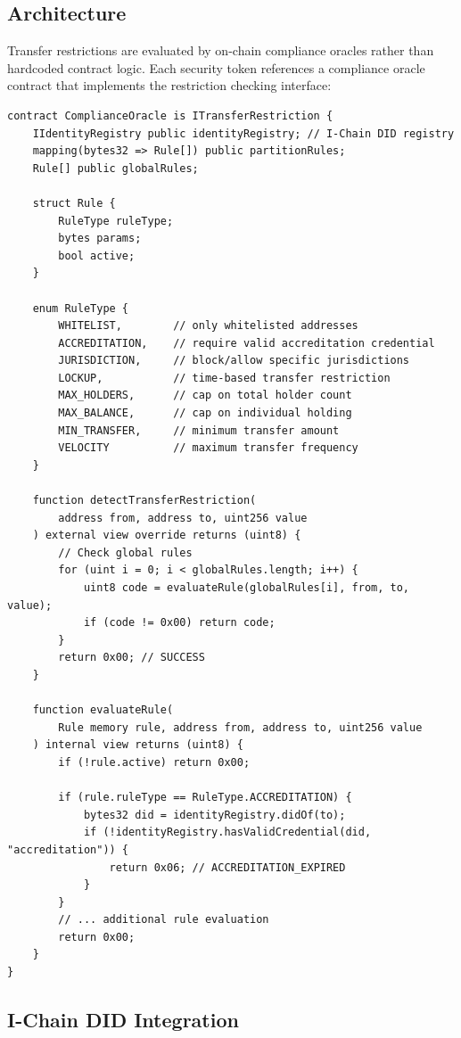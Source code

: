 \documentclass[11pt,a4paper]{article}
\begin{document}
\subsection{Architecture}

Transfer restrictions are evaluated by on-chain compliance oracles rather than hardcoded contract logic. Each security token references a compliance oracle contract that implements the restriction checking interface:

\begin{lstlisting}[language=Solidity,caption={Compliance oracle.}]
contract ComplianceOracle is ITransferRestriction {
    IIdentityRegistry public identityRegistry; // I-Chain DID registry
    mapping(bytes32 => Rule[]) public partitionRules;
    Rule[] public globalRules;

    struct Rule {
        RuleType ruleType;
        bytes params;
        bool active;
    }

    enum RuleType {
        WHITELIST,        // only whitelisted addresses
        ACCREDITATION,    // require valid accreditation credential
        JURISDICTION,     // block/allow specific jurisdictions
        LOCKUP,           // time-based transfer restriction
        MAX_HOLDERS,      // cap on total holder count
        MAX_BALANCE,      // cap on individual holding
        MIN_TRANSFER,     // minimum transfer amount
        VELOCITY          // maximum transfer frequency
    }

    function detectTransferRestriction(
        address from, address to, uint256 value
    ) external view override returns (uint8) {
        // Check global rules
        for (uint i = 0; i < globalRules.length; i++) {
            uint8 code = evaluateRule(globalRules[i], from, to, value);
            if (code != 0x00) return code;
        }
        return 0x00; // SUCCESS
    }

    function evaluateRule(
        Rule memory rule, address from, address to, uint256 value
    ) internal view returns (uint8) {
        if (!rule.active) return 0x00;

        if (rule.ruleType == RuleType.ACCREDITATION) {
            bytes32 did = identityRegistry.didOf(to);
            if (!identityRegistry.hasValidCredential(did, "accreditation")) {
                return 0x06; // ACCREDITATION_EXPIRED
            }
        }
        // ... additional rule evaluation
        return 0x00;
    }
}
\end{lstlisting}

\subsection{I-Chain DID Integration}
\end{document}
